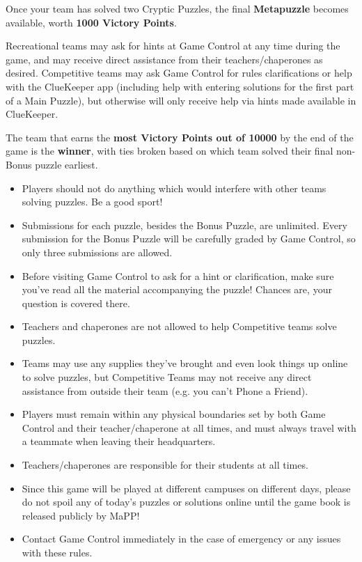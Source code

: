 
Once your team has solved two Cryptic Puzzles, the final \textbf{Metapuzzle}
becomes available, worth \textbf{1000 Victory Points}.

\newpage


Recreational teams may ask for hints at Game Control at any time during
the game, and may receive direct assistance from their teachers/chaperones
as desired.
Competitive teams may ask Game Control for rules clarifications or help
with the ClueKeeper app (including help with entering solutions
for the first part of a Main Puzzle), but otherwise
will only receive help via hints made available in ClueKeeper.


The team that earns the \textbf{most Victory Points out of 10000}
by the end of the game is the \textbf{winner}, with ties broken based
on which team solved their final non-Bonus puzzle earliest. 


\begin{itemize}
\item Players should not do anything which
would interfere with other teams solving puzzles. Be a good sport!
\item Submissions for each puzzle, besides the Bonus Puzzle, are unlimited.
Every submission for the Bonus Puzzle will be carefully graded by Game Control,
so only three submissions are allowed.
\item Before visiting Game Control to ask for a hint or clarification, make
sure you've read all the material accompanying the puzzle! Chances are,
your question is covered there.
\item Teachers and chaperones are not allowed to help Competitive teams solve
puzzles.
\item Teams may use any supplies they've brought and even
look things up online to solve puzzles, but Competitive Teams may not receive any direct
assistance from outside their team (e.g. you can't Phone a Friend).
\item Players must remain within any physical boundaries set by both
Game Control and their teacher/chaperone at all times, and must always
travel with a teammate when leaving their headquarters.
\item Teachers/chaperones are responsible for their students at
all times.
\item Since this game will be played at different campuses on different
days, please do not spoil any of today's puzzles or solutions online until
the game book is released publicly by MaPP!
\item Contact Game Control immediately in the case of emergency
or any issues with these rules.
\end{itemize}

